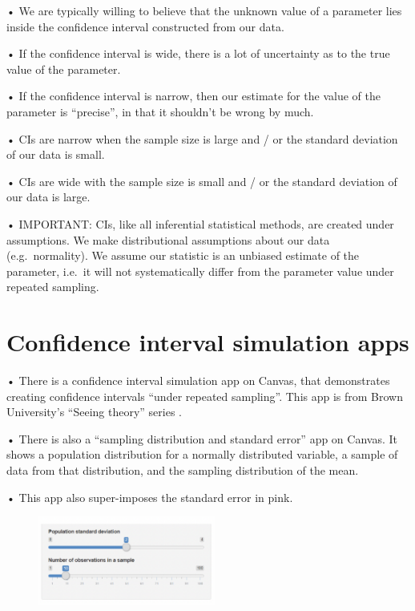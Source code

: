 \documentclass[
  letterpaper,
  DIV=11,
  numbers=noendperiod]{scrreprt}
\begin{document}
• We are typically willing to believe that the unknown value of a
parameter lies inside the confidence interval constructed from our data.

• If the confidence interval is wide, there is a lot of uncertainty as
to the true value of the parameter.

• If the confidence interval is narrow, then our estimate for the value
of the parameter is ``precise'', in that it shouldn't be wrong by much.

• CIs are narrow when the sample size is large and / or the standard
deviation of our data is small.

• CIs are wide with the sample size is small and / or the standard
deviation of our data is large.

• IMPORTANT: CIs, like all inferential statistical methods, are created
under assumptions. We make distributional assumptions about our data
(e.g.~normality). We assume our statistic is an unbiased estimate of the
parameter, i.e.~it will not systematically differ from the parameter
value under repeated sampling.

\hypertarget{confidence-interval-simulation-apps}{%
\section{Confidence interval simulation
apps}\label{confidence-interval-simulation-apps}}

• There is a confidence interval simulation app on Canvas, that
demonstrates creating confidence intervals ``under repeated sampling''.
This app is from Brown University's ``Seeing theory'' series .

• There is also a ``sampling distribution and standard error'' app on
Canvas. It shows a population distribution for a normally distributed
variable, a sample of data from that distribution, and the sampling
distribution of the mean.

• This app also super-imposes the standard error in pink.

\begin{figure}

\includegraphics[width=2.29167in,height=\textheight]{images/mod1_6.png} \hfill{}

\end{figure}
\end{document}
